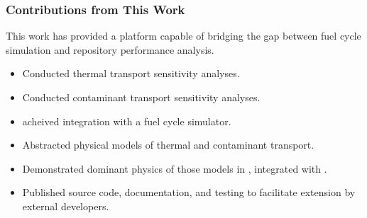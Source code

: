 \begin{frame}[ctb!]
\frametitle{Contributions from This Work}

This work has provided a platform capable of bridging the gap between fuel cycle 
simulation and repository performance analysis.

  \begin{itemize}
  \item Conducted thermal transport sensitivity analyses. \cite{huff_numerical_2012, huff_benchmarking_2012}
  \item Conducted contaminant transport sensitivity analyses. \cite{huff_key_2012}
  \item \Cyder acheived integration with a fuel cycle simulator.
  \item Abstracted physical models of thermal and contaminant transport. \cite{huff_hydrologic_2013}
  \item Demonstrated dominant physics of those models in \Cyder, integrated 
  with \Cyclus. \cite{huff_dynamic_2013, huff_cyclus_2013}
  \item Published source code, documentation, and testing to facilitate 
  extension by external developers. \cite{huff_cyder_2013}
  \end{itemize}
\end{frame}

